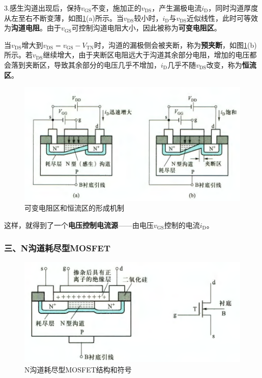 3.感生沟道出现后，保持$v_{\mathrm{GS}}$不变，施加正的$v_{\mathrm{DS}}$，产生漏极电流$i_{\mathrm{D}}$，同时沟道厚度从左至右不断变薄，如图\ref{可变电阻区和恒流区的形成机制}(a)所示。当$v_{\mathrm{DS}}$较小时，$i_{\mathrm{D}}$与$v_{\mathrm{DS}}$近似线性，此时可等效为\textbf{沟道电阻}。由于$v_{\mathrm{GS}}$可控制沟道电阻大小，因此被称为\textbf{可变电阻区}。

当$v_{\mathrm{DS}}$增大到$v_{\mathrm{DS}}=v_{\mathrm{GS}}-V_{\mathrm{TN}}$时，沟道的漏极侧会被夹断，称为\textbf{预夹断}，如图\ref{可变电阻区和恒流区的形成机制}(b)所示。若$v_{\mathrm{DS}}$继续增大，由于夹断区电阻远大于沟道其余部分电阻，增加的电压都会落到夹断区，导致其余部分的电压几乎不增加，$i_\mathrm{D}$几乎不随$v_{\mathrm{DS}}$改变，称为\textbf{恒流区}。

\begin{figure}[htb]
    \centering
    \includegraphics[width=0.65\linewidth]{pic/可变电阻区和恒流区的形成机制.png}
    \caption{可变电阻区和恒流区的形成机制\cite{康华光}\label{可变电阻区和恒流区的形成机制}}
\end{figure}

这样，就得到了一个\textbf{电压控制电流源}——由电压$v_{\mathrm{GS}}$控制的电流$i_\mathrm{D}$。

\subsubsection{三、N沟道耗尽型MOSFET}
\begin{figure}[htb]
    \centering
    \includegraphics[width=0.6\linewidth]{pic/N沟道耗尽型MOSFET结构和符号.png}
    \caption{N沟道耗尽型MOSFET结构和符号\cite{康华光}\label{N沟道耗尽型MOSFET结构和符号}}
\end{figure}

